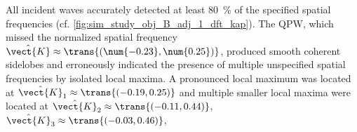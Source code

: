 All incident waves accurately detected
at least
\SI{80}{\percent} of
the specified spatial frequencies
(cf. \cref{fig:sim_study_obj_B_adj_1_dft_kap}).
The \ac{QPW}, which missed
the normalized spatial frequency
$\hat{\vect{K}} \approx \trans{ ( \num{-0.23}, \num{0.25} ) }$, produced
smooth coherent sidelobes and erroneously indicated
the presence of
multiple unspecified spatial frequencies by
isolated local maxima.
A pronounced local maximum was located at
$\hat{\vect{K}}_{1} \approx \trans{ ( -0.19, 0.25 ) }$ and
multiple smaller local maxima were located at
$\hat{\vect{K}}_{2} \approx \trans{ ( -0.11, 0.44 ) }$,
$\hat{\vect{K}}_{3} \approx \trans{ ( -0.03, 0.46 ) }$,
